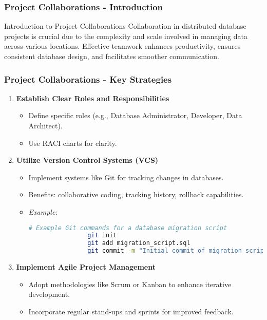 \documentclass[aspectratio=169]{beamer}
\begin{document}
\begin{frame}[fragile]
    \frametitle{Project Collaborations - Introduction}
    \begin{block}{Introduction to Project Collaborations}
        Collaboration in distributed database projects is crucial due to the complexity and scale involved in managing data across various locations. 
        Effective teamwork enhances productivity, ensures consistent database design, and facilitates smoother communication.
    \end{block}
\end{frame}

\begin{frame}[fragile]
    \frametitle{Project Collaborations - Key Strategies}
    \begin{enumerate}
        \item \textbf{Establish Clear Roles and Responsibilities}
        \begin{itemize}
            \item Define specific roles (e.g., Database Administrator, Developer, Data Architect).
            \item Use RACI charts for clarity.
        \end{itemize}

        \item \textbf{Utilize Version Control Systems (VCS)}
        \begin{itemize}
            \item Implement systems like Git for tracking changes in databases.
            \item Benefits: collaborative coding, tracking history, rollback capabilities.
            \item \textit{Example:} 
            \begin{lstlisting}[language=bash]
                # Example Git commands for a database migration script
                git init
                git add migration_script.sql
                git commit -m "Initial commit of migration script"
            \end{lstlisting}
        \end{itemize}
        
        \item \textbf{Implement Agile Project Management}
        \begin{itemize}
            \item Adopt methodologies like Scrum or Kanban to enhance iterative development.
            \item Incorporate regular stand-ups and sprints for improved feedback.
        \end{itemize}
    \end{enumerate}
\end{frame}
\end{document}
